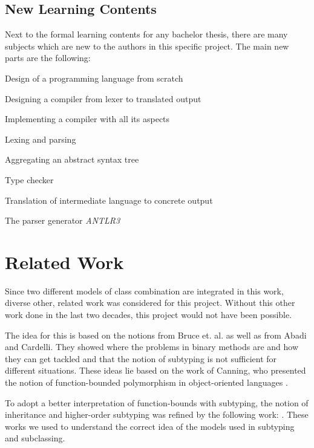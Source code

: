 \subsection{New Learning Contents}
Next to the formal learning contents for any bachelor thesis, there are many
subjects which are new to the authors in this specific project. The main new parts are the following:

\squishlist
	\item Design of a programming language from scratch
	\item Designing a compiler from lexer to translated output
	\item Implementing a compiler with all its aspects
	\squishlist
		\item Lexing and parsing
		\item Aggregating an abstract syntax tree
		\item Type checker
		\item Translation of intermediate language to concrete output
	\squishend
	\item The parser generator \emph{ANTLR3}
\squishend

\section{Related Work}
Since two different models of class combination are integrated in this
work, diverse other, related work was considered for this project.
Without this other work done in the last two decades, this project would not
have been possible.

The idea for this is based on the notions from Bruce et. al. as
well as from Abadi and Cardelli.  They showed where the
problems in binary methods are and how they can get tackled
and that the notion of subtyping is not sufficient for different
situations\cite{bruce_binary_1995,abadi_subtyping_1996}. These ideas lie
based on the work of Canning, who presented the notion of function-bounded
polymorphism in object-oriented languages \cite{canning_f-bounded_1989}.

To adopt a better interpretation of function-bounds
with subtyping, the notion of inheritance and
higher-order subtyping was refined by the following work:
\cite{steffen_higher-order_1994,cook_inheritance_1990,taivalsaari_notion_1996}.
These works we used to understand the correct idea of the models used
in subtyping and subclassing.

